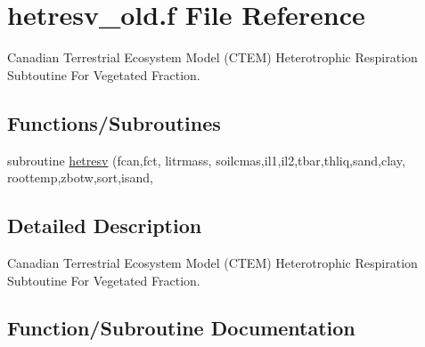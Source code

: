 \hypertarget{hetresv__old_8f}{}\section{hetresv\+\_\+old.\+f File Reference}
\label{hetresv__old_8f}


Canadian Terrestrial Ecosystem Model (C\+T\+E\+M) Heterotrophic Respiration Subtoutine For Vegetated Fraction.  


\subsection*{Functions/\+Subroutines}
\begin{DoxyCompactItemize}
\item 
subroutine \hyperlink{hetresv__old_8f_a7c85e7b43e5a20c6049f3fd703627461}{hetresv} (fcan,fct, litrmass, soilcmas,il1,il2,tbar,thliq,sand,clay, roottemp,zbotw,sort,isand,
\end{DoxyCompactItemize}


\subsection{Detailed Description}
Canadian Terrestrial Ecosystem Model (C\+T\+E\+M) Heterotrophic Respiration Subtoutine For Vegetated Fraction. 



\subsection{Function/\+Subroutine Documentation}
\hypertarget{hetresv__old_8f_a7c85e7b43e5a20c6049f3fd703627461}{}
